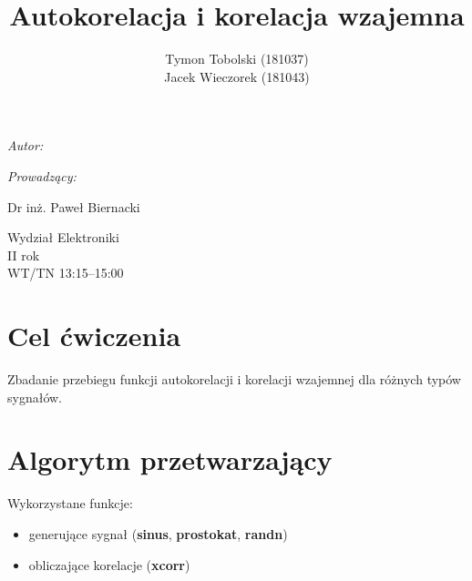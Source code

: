 \documentclass[wide,a4paper,titlepage,12pt]{mwart}
\title{Autokorelacja i korelacja wzajemna}
\author{Tymon Tobolski (181037)\\ Jacek Wieczorek (181043)}
\makeatletter
\renewcommand{\maketitle}{
\begin{titlepage}
  \begin{center}
    \vspace*{3cm}
    \LARGE \@title \par
    \vspace{2cm}
    \textit{\small Autor:}\par
    \normalsize \@author\par \normalsize
    \vspace{3cm}
    \textit{\small Prowadzący:}\par
    Dr inż. Paweł Biernacki \par
    \vspace{2cm}
    Wydział Elektroniki\\ II rok\\ WT/TN 13:15--15:00 \par
    \vspace{5cm}
    \small \@date
  \end{center}
\end{titlepage}
}
\makeatother
\begin{document}
  \maketitle
  \section{Cel ćwiczenia} %
  \label{sec:Cel}
    Zbadanie przebiegu funkcji autokorelacji i korelacji wzajemnej dla różnych typów sygnałów.
    
  \section{Algorytm przetwarzający}
    Wykorzystane funkcje:
    \newline
    \begin{itemize}
      \item generujące sygnał (\textbf{sinus}, \textbf{prostokat}, \textbf{randn})
      \item obliczające korelacje (\textbf{xcorr})
    \end{itemize}
  
  \lstset{ %
    language=Octave,                %
    basicstyle=\scriptsize,       %
    numbers=left,                   %
    numberstyle=\scriptsize,      %
    stepnumber=10,                   %
    numbersep=9pt,                  %
    showspaces=false,               %
    showstringspaces=false,         %
    showtabs=false,                 %
    breaklines=true,                %
    }
    
    
\end{document}
